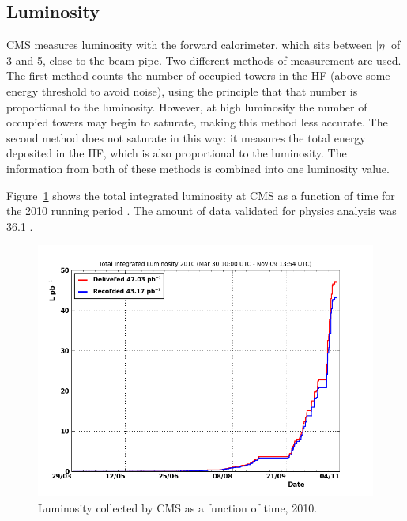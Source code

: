 \subsection{Luminosity}
\label{exp:lumi}

CMS measures luminosity with the forward calorimeter, which sits 
between $|\eta|$ of 3 and 5, close to the beam pipe.  
Two different methods of measurement are used.  
The first method counts the number of occupied towers in the HF 
(above some energy threshold to avoid noise), 
using the principle that that number is proportional to the luminosity.  
However, at high luminosity the number of occupied towers may begin to 
saturate, making this method less accurate.  
The second method does not saturate in this way: 
it measures the total energy deposited in the HF, 
which is also proportional to the luminosity.  
The information from both of these methods is combined into one 
luminosity value.  

Figure~\ref{fig:LuminosityVsTime} shows the total integrated luminosity at CMS 
as a function of time for the 2010 running period \cite{LumiPublicResults2010}.  
The amount of data validated for physics analysis was 
36.1 \pb.  

 \begin{figure}[htb]
  \begin{center}
    \includegraphics[width=360pt]{Figures/totallumivstime2010.png}
  \end{center}
  \caption[\fixspacing Luminosity collected by CMS as a function of time, 2010]
	  {\fixspacing Luminosity collected by CMS as a function of time, 2010.}
  \label{fig:LuminosityVsTime}
 \end{figure}



